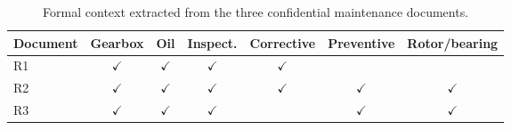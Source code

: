 \begin{table}[tbp]
\centering
\caption{Formal context extracted from the three confidential maintenance documents.}
\label{tab:context}
\scriptsize
\begin{tabular}{lcccccc}
\toprule
Document & Gearbox & Oil & Inspect. & Corrective & Preventive & Rotor/bearing\\
\midrule
R1 & $\checkmark$ & $\checkmark$ & $\checkmark$ & $\checkmark$ &  & \\
R2 & $\checkmark$ & $\checkmark$ & $\checkmark$ & $\checkmark$ & $\checkmark$ & $\checkmark$\\
R3 & $\checkmark$ & $\checkmark$ & $\checkmark$ &  & $\checkmark$ & $\checkmark$\\
\bottomrule
\end{tabular}
\end{table}

